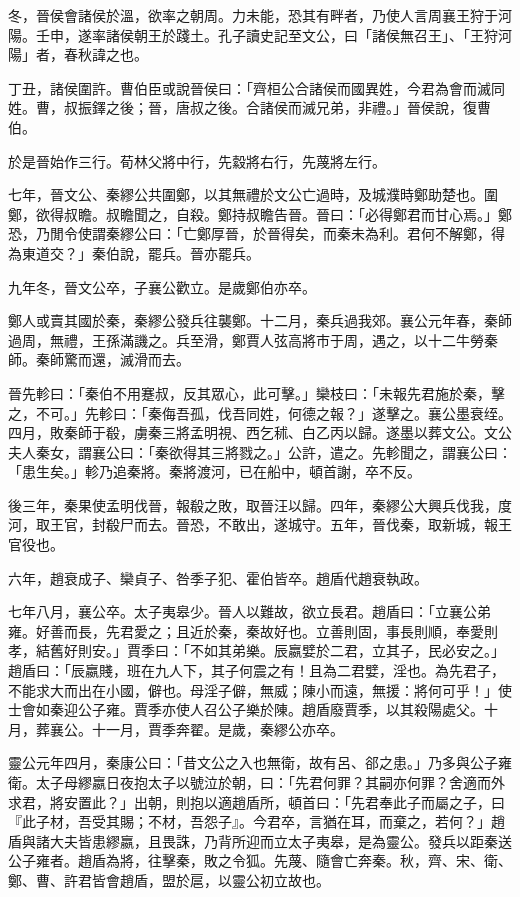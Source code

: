 \begin{pinyinscope}
冬，晉侯會諸侯於溫，欲率之朝周。力未能，恐其有畔者，乃使人言周襄王狩于河陽。壬申，遂率諸侯朝王於踐土。孔子讀史記至文公，曰「諸侯無召王」、「王狩河陽」者，春秋諱之也。

丁丑，諸侯圍許。曹伯臣或說晉侯曰：「齊桓公合諸侯而國異姓，今君為會而滅同姓。曹，叔振鐸之後；晉，唐叔之後。合諸侯而滅兄弟，非禮。」晉侯說，復曹伯。

於是晉始作三行。荀林父將中行，先縠將右行，先蔑將左行。

七年，晉文公、秦繆公共圍鄭，以其無禮於文公亡過時，及城濮時鄭助楚也。圍鄭，欲得叔瞻。叔瞻聞之，自殺。鄭持叔瞻告晉。晉曰：「必得鄭君而甘心焉。」鄭恐，乃閒令使謂秦繆公曰：「亡鄭厚晉，於晉得矣，而秦未為利。君何不解鄭，得為東道交？」秦伯說，罷兵。晉亦罷兵。

九年冬，晉文公卒，子襄公歡立。是歲鄭伯亦卒。

鄭人或賣其國於秦，秦繆公發兵往襲鄭。十二月，秦兵過我郊。襄公元年春，秦師過周，無禮，王孫滿譏之。兵至滑，鄭賈人弦高將市于周，遇之，以十二牛勞秦師。秦師驚而還，滅滑而去。

晉先軫曰：「秦伯不用蹇叔，反其眾心，此可擊。」欒枝曰：「未報先君施於秦，擊之，不可。」先軫曰：「秦侮吾孤，伐吾同姓，何德之報？」遂擊之。襄公墨衰绖。四月，敗秦師于殽，虜秦三將孟明視、西乞秫、白乙丙以歸。遂墨以葬文公。文公夫人秦女，謂襄公曰：「秦欲得其三將戮之。」公許，遣之。先軫聞之，謂襄公曰：「患生矣。」軫乃追秦將。秦將渡河，已在船中，頓首謝，卒不反。

後三年，秦果使孟明伐晉，報殽之敗，取晉汪以歸。四年，秦繆公大興兵伐我，度河，取王官，封殽尸而去。晉恐，不敢出，遂城守。五年，晉伐秦，取新城，報王官役也。

六年，趙衰成子、欒貞子、咎季子犯、霍伯皆卒。趙盾代趙衰執政。

七年八月，襄公卒。太子夷皋少。晉人以難故，欲立長君。趙盾曰：「立襄公弟雍。好善而長，先君愛之；且近於秦，秦故好也。立善則固，事長則順，奉愛則孝，結舊好則安。」賈季曰：「不如其弟樂。辰嬴嬖於二君，立其子，民必安之。」趙盾曰：「辰嬴賤，班在九人下，其子何震之有！且為二君嬖，淫也。為先君子，不能求大而出在小國，僻也。母淫子僻，無威；陳小而遠，無援：將何可乎！」使士會如秦迎公子雍。賈季亦使人召公子樂於陳。趙盾廢賈季，以其殺陽處父。十月，葬襄公。十一月，賈季奔翟。是歲，秦繆公亦卒。

靈公元年四月，秦康公曰：「昔文公之入也無衛，故有呂、郤之患。」乃多與公子雍衛。太子母繆嬴日夜抱太子以號泣於朝，曰：「先君何罪？其嗣亦何罪？舍適而外求君，將安置此？」出朝，則抱以適趙盾所，頓首曰：「先君奉此子而屬之子，曰『此子材，吾受其賜；不材，吾怨子』。今君卒，言猶在耳，而棄之，若何？」趙盾與諸大夫皆患繆嬴，且畏誅，乃背所迎而立太子夷皋，是為靈公。發兵以距秦送公子雍者。趙盾為將，往擊秦，敗之令狐。先蔑、隨會亡奔秦。秋，齊、宋、衛、鄭、曹、許君皆會趙盾，盟於扈，以靈公初立故也。


\end{pinyinscope}
